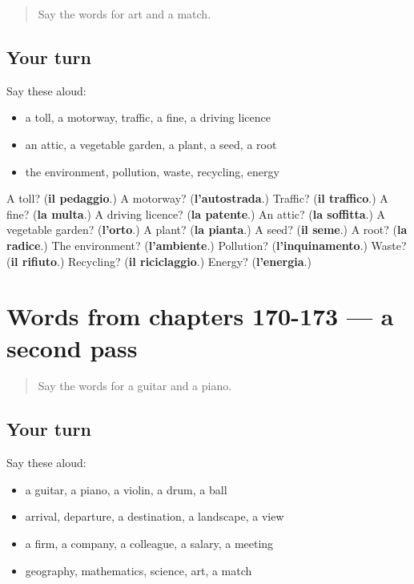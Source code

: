 \begin{quote}
Say the words for art and a match.
\end{quote}

\subsection*{Your turn}
Say these aloud:

\begin{itemize}
\raggedright
  \item a toll, a motorway, traffic, a fine, a driving licence
  \item an attic, a vegetable garden, a plant, a seed, a root
  \item the environment, pollution, waste, recycling, energy
\end{itemize}

\begin{tcolorbox}[breakable,colback=teal!4,colframe=teal!35!black,title={Before you move on}]
A toll? (\textbf{il pedaggio}.) A motorway? (\textbf{l'autostrada}.) Traffic? (\textbf{il traffico}.) A fine? (\textbf{la multa}.) A driving licence? (\textbf{la patente}.) An attic? (\textbf{la soffitta}.) A vegetable garden? (\textbf{l'orto}.) A plant? (\textbf{la pianta}.) A seed? (\textbf{il seme}.) A root? (\textbf{la radice}.) The environment? (\textbf{l'ambiente}.) Pollution? (\textbf{l'inquinamento}.) Waste? (\textbf{il rifiuto}.) Recycling? (\textbf{il riciclaggio}.) Energy? (\textbf{l'energia}.)
\end{tcolorbox}
\section[(dialogue)]{Words from chapters 170-173 — a second pass}

\label{lesson:IT-R173-second-pass-words-from-chapters-170-173}



\begin{quote}
Say the words for a guitar and a piano.
\end{quote}

\subsection*{Your turn}
Say these aloud:

\begin{itemize}
\raggedright
  \item a guitar, a piano, a violin, a drum, a ball
  \item arrival, departure, a destination, a landscape, a view
  \item a firm, a company, a colleague, a salary, a meeting
  \item geography, mathematics, science, art, a match
\end{itemize}

